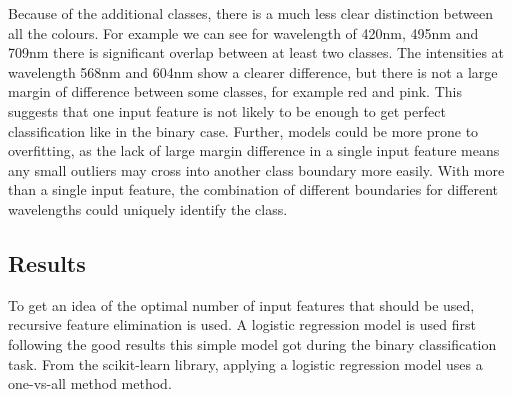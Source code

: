 \documentclass{article}
\begin{document}
\noindent
Because of the additional classes, there is a much less clear distinction between all the colours. For example we can see for wavelength of 420nm, 495nm and 709nm there is significant overlap between at least two classes. The intensities at wavelength 568nm and 604nm show a clearer difference, but there is not a large margin of difference between some classes, for example red and pink. This suggests that one input feature is not likely to be enough to get perfect classification like in the binary case. Further, models could be more prone to overfitting, as the lack of large margin difference in a single input feature means any small outliers may cross into another class boundary more easily. With more than a single input feature, the combination of different boundaries for different wavelengths could uniquely identify the class. 

\subsection{Results}
To get an idea of the optimal number of input features that should be used, recursive feature elimination is used. A logistic regression model is used first following the good results this simple model got during the binary classification task. From the scikit-learn library, applying a logistic regression model uses a one-vs-all method method.
\end{document}
